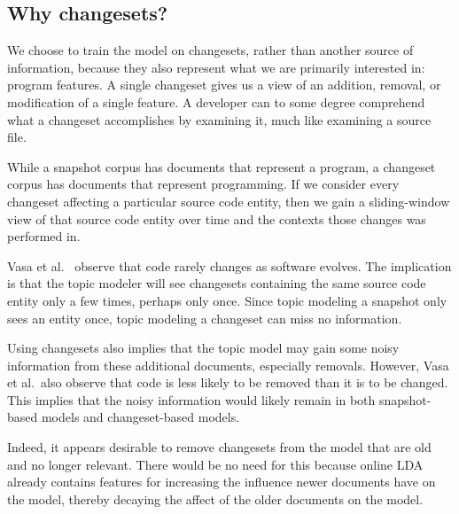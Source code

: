 

\subsection{Why changesets?}

We choose to train the model on changesets, rather than another source of
information, because they also represent what we are primarily interested in:
program features.  A single changeset gives us a view of an addition, removal,
or modification of a single feature.  A developer can to some degree comprehend
what a changeset accomplishes by examining it, much like examining a source
file.

While a snapshot corpus has documents that represent a program, a changeset
corpus has documents that represent programming.  If we consider every changeset
affecting a particular source code entity, then we gain a sliding-window view of
that source code entity over time and the contexts those changes was performed
in.

Vasa et al.~\cite{Vasa-etal:2007} observe that code rarely changes as software
evolves. The implication is that the topic modeler will see changesets
containing the same source code entity only a few times, perhaps only once.
Since topic modeling a snapshot only sees an entity once, topic modeling
a changeset can miss no information.

Using changesets also implies that the topic model may gain some noisy
information from these additional documents, especially removals.  However, Vasa
et al.\ also observe that code is less likely to be removed than it is to be
changed. This implies that the noisy information would likely remain in both
snapshot-based models and changeset-based models.

Indeed, it appears desirable to remove changesets from the model that are old
and no longer relevant. There would be no need for this because online LDA
already contains features for increasing the influence newer documents have on
the model, thereby decaying the affect of the older documents on the model.


